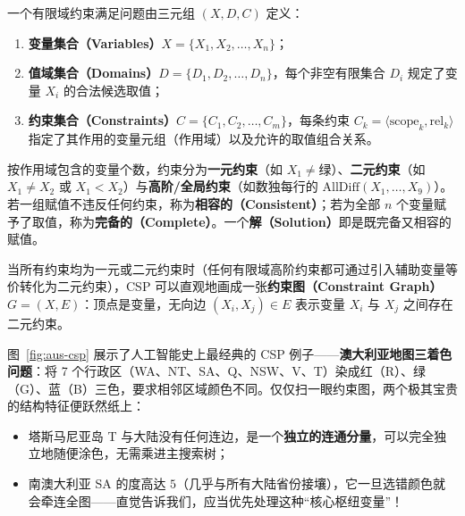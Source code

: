 \begin{defBox}
\begin{definition}\label{def:csp}
一个有限域约束满足问题由三元组 $(X, D, C)$ 定义：
\begin{enumerate}
  \item \textbf{变量集合（Variables）}$X = \{X_1, X_2, \dots, X_n\}$；
  \item \textbf{值域集合（Domains）}$D = \{D_1, D_2, \dots, D_n\}$，每个非空有限集合 $D_i$ 规定了变量 $X_i$ 的合法候选取值；
  \item \textbf{约束集合（Constraints）}$C = \{C_1, C_2, \dots, C_m\}$，每条约束 $C_k = \langle \text{scope}_k, \text{rel}_k \rangle$ 指定了其作用的变量元组（作用域）以及允许的取值组合关系。
\end{enumerate}
按作用域包含的变量个数，约束分为\textbf{一元约束}（如 $X_1 \neq \text{绿}$）、\textbf{二元约束}（如 $X_1 \neq X_2$ 或 $X_1 < X_2$）与\textbf{高阶/全局约束}（如数独每行的 $\mathrm{AllDiff}(X_1,\dots,X_9)$）。若一组赋值不违反任何约束，称为\textbf{相容的（Consistent）}；若为全部 $n$ 个变量赋予了取值，称为\textbf{完备的（Complete）}。一个\textbf{解（Solution）}即是既完备又相容的赋值。
\end{definition}
\end{defBox}

当所有约束均为一元或二元约束时（任何有限域高阶约束都可通过引入辅助变量等价转化为二元约束），CSP 可以直观地画成一张\textbf{约束图（Constraint Graph）}$G=(X, E)$：顶点是变量，无向边 $(X_i, X_j) \in E$ 表示变量 $X_i$ 与 $X_j$ 之间存在二元约束。

图~\ref{fig:aus-csp} 展示了人工智能史上最经典的 CSP 例子——\textbf{澳大利亚地图三着色问题}：将 7 个行政区（\textsf{WA}、\textsf{NT}、\textsf{SA}、\textsf{Q}、\textsf{NSW}、\textsf{V}、\textsf{T}）染成红（R）、绿（G）、蓝（B）三色，要求相邻区域颜色不同。仅仅扫一眼约束图，两个极其宝贵的结构特征便跃然纸上：
\begin{itemize}
  \item 塔斯马尼亚岛 \textsf{T} 与大陆没有任何连边，是一个\textbf{独立的连通分量}，可以完全独立地随便涂色，无需乘进主搜索树；
  \item 南澳大利亚 \textsf{SA} 的度高达 $5$（几乎与所有大陆省份接壤），它一旦选错颜色就会牵连全图——直觉告诉我们，应当优先处理这种“核心枢纽变量”！
\end{itemize}

